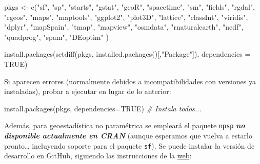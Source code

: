 \documentclass[
  spanish,
]{book}
\newenvironment{Shaded}{\begin{snugshade}}{\end{snugshade}}
\newcommand{\AttributeTok}[1]{\textcolor[rgb]{0.77,0.63,0.00}{#1}}
\newcommand{\CommentTok}[1]{\textcolor[rgb]{0.56,0.35,0.01}{\textit{#1}}}
\newcommand{\ConstantTok}[1]{\textcolor[rgb]{0.00,0.00,0.00}{#1}}
\newcommand{\FunctionTok}[1]{\textcolor[rgb]{0.00,0.00,0.00}{#1}}
\newcommand{\NormalTok}[1]{#1}
\newcommand{\OtherTok}[1]{\textcolor[rgb]{0.56,0.35,0.01}{#1}}
\newcommand{\StringTok}[1]{\textcolor[rgb]{0.31,0.60,0.02}{#1}}
\theoremstyle{break}
\theoremstyle{definition}
\theoremstyle{definition}
\theoremstyle{definition}
\theoremstyle{definition}
\theoremstyle{remark}
\begin{document}
\begin{Shaded}
\begin{Highlighting}[]
\NormalTok{pkgs }\OtherTok{\textless{}{-}} \FunctionTok{c}\NormalTok{(}\StringTok{"sf"}\NormalTok{, }\StringTok{"sp"}\NormalTok{, }\StringTok{"starts"}\NormalTok{, }\StringTok{"gstat"}\NormalTok{, }\StringTok{"geoR"}\NormalTok{, }\StringTok{"spacetime"}\NormalTok{, }\StringTok{"sm"}\NormalTok{, }\StringTok{"fields"}\NormalTok{, }
          \StringTok{"rgdal"}\NormalTok{, }\StringTok{"rgeos"}\NormalTok{, }\StringTok{"maps"}\NormalTok{, }\StringTok{"maptools"}\NormalTok{, }\StringTok{"ggplot2"}\NormalTok{, }\StringTok{"plot3D"}\NormalTok{, }\StringTok{"lattice"}\NormalTok{, }
          \StringTok{"classInt"}\NormalTok{, }\StringTok{"viridis"}\NormalTok{, }\StringTok{"dplyr"}\NormalTok{, }\StringTok{"mapSpain"}\NormalTok{, }\StringTok{"tmap"}\NormalTok{, }\StringTok{"mapview"}\NormalTok{, }
          \StringTok{"osmdata"}\NormalTok{, }\StringTok{"rnaturalearth"}\NormalTok{, }\StringTok{"ncdf"}\NormalTok{, }\StringTok{"quadprog"}\NormalTok{, }\StringTok{"spam"}\NormalTok{, }\StringTok{"DEoptim"}\NormalTok{ )}

\FunctionTok{install.packages}\NormalTok{(}\FunctionTok{setdiff}\NormalTok{(pkgs, }\FunctionTok{installed.packages}\NormalTok{()[,}\StringTok{"Package"}\NormalTok{]), }\AttributeTok{dependencies =} \ConstantTok{TRUE}\NormalTok{)}
\end{Highlighting}
\end{Shaded}

Si aparecen errores (normalmente debidos a incompatibilidades con versiones ya instaladas), probar a ejecutar en lugar de lo anterior:

\begin{Shaded}
\begin{Highlighting}[]
\FunctionTok{install.packages}\NormalTok{(pkgs, }\AttributeTok{dependencies=}\ConstantTok{TRUE}\NormalTok{) }\CommentTok{\# Instala todos...}
\end{Highlighting}
\end{Shaded}

Además, para geoestadística no paramétrica se empleará el paquete \href{https://rubenfcasal.github.io/npsp}{\texttt{npsp}} \textbf{\emph{no disponible actualmente en CRAN}} (aunque esperamos que vuelva a estarlo pronto\ldots{} incluyendo soporte para el paquete \texttt{sf}).
Se puede instalar la versión de desarrollo en GitHub, siguiendo las instrucciones de la \href{https://rubenfcasal.github.io/npsp/\#installation}{web}:
\end{document}
